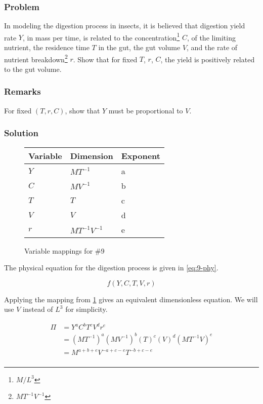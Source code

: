 \documentclass[12pt]{article}
\begin{document}
  \subsubsection*{Problem}
  In modeling the digestion process in insects, it is believed that digestion
  yield rate $Y$, in mass per time, is related to the
  concentration\footnote{$M/L^3$} $C$, of the limiting nutrient, the residence
  time $T$ in the gut, the gut volume $V$, and the rate of nutrient
  breakdown\footnote{$MT^{-1}V^{-1}$} $r$. Show that for fixed $T$, $r$, $C$,
  the yield is positively related to the gut volume.

  \subsubsection*{Remarks}
  For fixed $(T,r,C)$, show that $Y$ must be proportional to $V$.

  \subsubsection*{Solution}
  \begin{figure}
    \centering
    \begin{tabularx}{0.5\textwidth}{XXX}
      Variable & Dimension & Exponent \\ \midrule
      $Y$ & $MT^{-1}$ & a \\
      $C$ & $MV^{-1}$ & b \\
      $T$ & $T$ & c \\
      $V$ & $V$ & d \\
      $r$ & $MT^{-1}V^{-1}$ & e \\
    \end{tabularx}
    \caption{Variable mappings for \#9}
\label{fig:9-var-mappings}
  \end{figure}

  The physical equation for the digestion process is given in \cref{eq:9-phy}.

  \begin{equation}
    \label{eq:9-phy}
    f(Y,C,T,V,r)
  \end{equation}

  Applying the mapping from \cref{fig:9-var-mappings} gives an equivalent
  dimensionless equation. We will use $V$ instead of $L^3$ for simplicity.

  \begin{equation}
    \label{eq:9-var}
    \begin{aligned}
      \Pi &= Y^a C^b T^c V^d r^e \\
      &= {(MT^{-1})}^a {(MV^{-1})}^b {(T)}^c {(V)}^d {(MT^{-1}V)}^e \\
      &= M^{a+b+e}V^{-a+c-e}T^{-b+c-e} \\
    \end{aligned}
  \end{equation}
\end{document}
